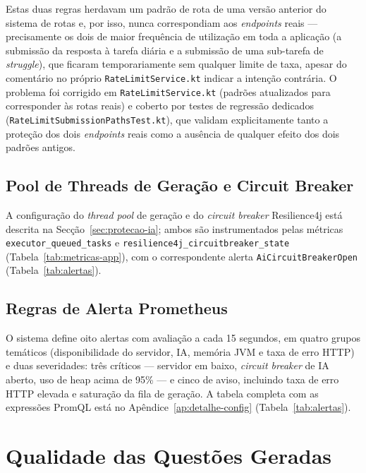 Estas duas regras herdavam um padrão de rota de uma versão anterior do sistema de rotas e, por isso, nunca correspondiam aos \textit{endpoints} reais --- precisamente os dois de maior frequência de utilização em toda a aplicação (a submissão da resposta à tarefa diária e a submissão de uma sub-tarefa de \textit{struggle}), que ficaram temporariamente sem qualquer limite de taxa, apesar do comentário no próprio \texttt{RateLimitService.kt} indicar a intenção contrária. O problema foi corrigido em \texttt{RateLimitService.kt} (padrões atualizados para corresponder às rotas reais) e coberto por testes de regressão dedicados (\texttt{RateLimitSubmissionPathsTest.kt}), que validam explicitamente tanto a proteção dos dois \textit{endpoints} reais como a ausência de qualquer efeito dos dois padrões antigos.

\subsection{Pool de Threads de Geração e Circuit Breaker} \label{sec:thread-pool-cb}

A configuração do \textit{thread pool} de geração e do \textit{circuit breaker} Resilience4j está descrita na Secção~\ref{sec:protecao-ia}; ambos são instrumentados pelas métricas \texttt{executor\_queued\_tasks} e \texttt{resilience4j\_circuitbreaker\_state} (Tabela~\ref{tab:metricas-app}), com o correspondente alerta \texttt{AiCircuitBreakerOpen} (Tabela~\ref{tab:alertas}).

\subsection{Regras de Alerta Prometheus} \label{sec:alertas-prometheus}

O sistema define oito alertas com avaliação a cada 15 segundos, em quatro grupos temáticos (disponibilidade do servidor, IA, memória JVM e taxa de erro HTTP) e duas severidades: três críticos --- servidor em baixo, \textit{circuit breaker} de IA aberto, uso de heap acima de 95\% --- e cinco de aviso, incluindo taxa de erro HTTP elevada e saturação da fila de geração. A tabela completa com as expressões PromQL está no Apêndice~\ref{ap:detalhe-config} (Tabela~\ref{tab:alertas}).

\section{Qualidade das Questões Geradas} \label{sec:qualidade}

